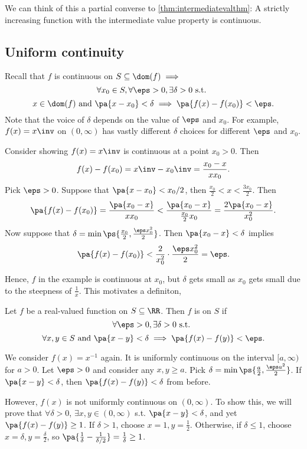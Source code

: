 \documentclass[11pt]{scrartcl}
\numberwithin{equation}{section}
\begin{document}
We can think of this a partial converse to \cref{thm:intermediatevalthm}:
A strictly increasing function with the intermediate value property 
is continuous.
\subsection{Uniform continuity}
Recall that $f$ is continuous on $S\subseteq\dom(f) \implies$
\[ \forall x_0\in S, \forall \eps>0, \exists \delta>0 \text{ s.t. } \]
\[ x\in\dom(f) \text{ and } \pa{x-x_0}<\delta\implies \pa{f(x)-f(x_0)}<\eps. \]
Note that the voice of $\delta$ depends on the value of $\eps$ and $x_0$.
For example, $f(x) = x\inv$ on $(0,\infty)$ has vastly different $\delta$
choices for different $\eps$ and $x_0$.

\begin{example}
Consider showing $f(x)=x\inv$ is continuous at a point $x_0>0$.
Then 
\[ f(x) - f(x_0) = x\inv - x_0\inv = \frac{x_0-x}{xx_0}.\]
Pick $\eps>0$. Suppose that $\pa{x-x_0} < x_0/2$, then $\frac{x_0}{2}<x<\frac{3x_0}{2}$. Then 
\[\pa{f(x) - f(x_0)} =\frac{\pa{x_0-x}}{xx_0} < \frac{\pa{x_0-x}}{\frac{x_0}{2}x_0} = \frac{2\pa{x_0-x}}{x_0^2}. \] 
Now suppose that $\delta=\min\ps{\frac{x_0}{2}, \frac{\eps x_0^2}{2}}$. 
Then $\pa{x_0-x} < \delta$ implies 
\[\pa{f(x)-f(x_0)} < \frac{2}{x_0^2}\cdot\frac{\eps x_0^2}{2}= \eps. \]
\end{example}
Hence, $f$ in the example is continuous at $x_0$, but $\delta$ gets small as 
$x_0$ gets small due to the steepness of $\frac{1}{x}$.
This motivates a definiton, 

\begin{definition}
    Let $f$ be a real-valued function on $S\subseteq \RR$. Then $f$ is 
     on $S$ if 
    \[ \forall \eps>0, \exists \delta>0 \text{ s.t. }\]
    \[ \forall x,y\in S \text{ and } \pa{x-y} < \delta \implies \pa{f(x)-f(y)}< \eps.\]
\end{definition}

\begin{example}
    We consider $f(x) = x^{-1}$ again. It is uniformly continuous 
    on the interval $[a,\infty)$ for $a>0$. Let $\eps>0$ and consider any $x,y\geq a$. Pick $\delta=\min\ps{\frac{a}{2}, \frac{\eps a^2}{2}}$.
    If $\pa{x-y}<\delta$, then $\pa{f(x)-f(y)} <\delta$ from before.

    However, $f(x)$ is not uniformly continuous on $(0,\infty)$.
    To show this, we will prove that 
    $\forall \delta>0$, $\exists x,y \in (0,\infty)$
    s.t. $\pa{x-y} < \delta$, and yet $\pa{f(x)-f(y)}\geq 1$.
    If $\delta>1$, choose $x=1, y=\frac{1}{2}$.
    Otherwise, if $\delta\leq 1$, choose $x=\delta, y=\frac{\delta}{2}$,
    so $\pa{\frac{1}{\delta}-\frac{1}{\delta/2}} = \frac{1}{\delta}\geq 1$.
\end{example}
\end{document}
